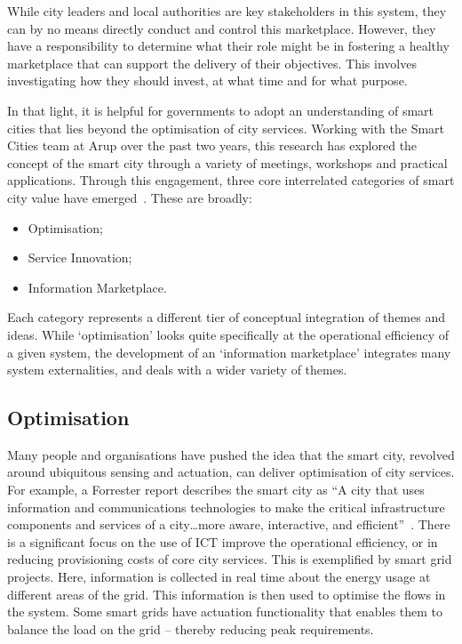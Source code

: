 \documentclass[conference]{IEEEtran}
\begin{document}
While city leaders and local authorities are key stakeholders in this
system, they can by no means directly conduct and control this
marketplace. However, they have a responsibility to determine what
their role might be in fostering a healthy marketplace that can
support the delivery of their objectives. This involves investigating
how they should invest, at what time and for what purpose.

In that light, it is helpful for governments to adopt an understanding
of smart cities that lies beyond the optimisation of city
services. Working with the Smart Cities team at Arup over the past two
years, this research has explored the concept of the smart city
through a variety of meetings, workshops and practical
applications. Through this engagement, three core interrelated
categories of smart city value have
emerged~\cite{arup-et-al:2011,cosgrave-et-al:2013}. These are broadly:

\begin{itemize} 
\item Optimisation;
\item Service Innovation;
\item Information Marketplace.
\end{itemize}

Each category represents a different tier of conceptual integration of
themes and ideas. While `optimisation' looks quite specifically at the
operational efficiency of a given system, the development of an
`information marketplace' integrates many system externalities, and
deals with a wider variety of themes.

\subsection{Optimisation}
Many people and organisations have pushed the idea that the smart
city, revolved around ubiquitous sensing and actuation, can deliver
optimisation of city services. For example, a Forrester report
describes the smart city as ``A city that uses information and
communications technologies to make the critical infrastructure
components and services of a city…more aware, interactive, and
efficient''~\cite{belissent:2010}. There is a significant focus on the
use of ICT improve the operational efficiency, or in reducing
provisioning costs of core city services. This is exemplified by smart
grid projects. Here, information is collected in real time about the
energy usage at different areas of the grid. This information is then
used to optimise the flows in the system. Some smart grids have
actuation functionality that enables them to balance the load on the
grid -- thereby reducing peak requirements.
\end{document}
